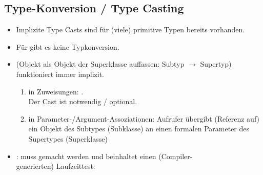 \subsection{Type-Konversion / Type Casting}
\begin{itemize}
	\item Implizite Type Casts sind für (viele) primitive Typen bereits vorhanden.
	\item Für  gibt es keine Typkonversion.
	\item {} (Objekt als Objekt der Superklasse auffassen: Subtyp $\to$ Supertyp) funktioniert immer implizit.
	\begin{enumerate}[label=(\arabic*)]
		\item in Zuweisungen: .\\
		Der Cast  ist  notwendig / optional.
		\item in Parameter-/Argument-Assoziationen: 
		Aufrufer übergibt (Referenz auf) ein Objekt des Subtypes (Subklasse) an einen formalen Parameter des Supertypes (Superklasse)
	\end{enumerate}
	\item {}: muss  gemacht werden und beinhaltet einen (Compiler-\\generierten) Laufzeittest:\\
\end{itemize}

